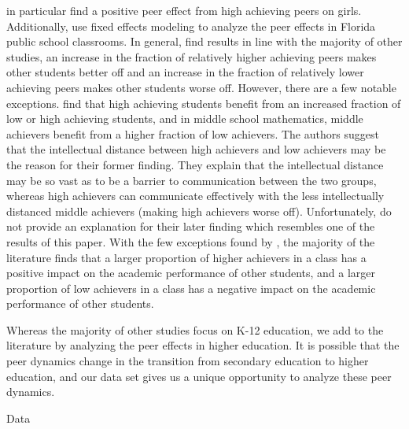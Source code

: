 \documentclass[12pt,a4paper,english,fleqn]{article}
\makeatletter
\newcommand{\sectlabel}[1]{section~\ref{#1} (\nameref{#1})}
\renewcommand\section{\@startsection{section}{1}{\z@}
{-5ex \@plus -1ex \@minus -.2ex}{2.3ex \@plus.2ex}{\normalfont\large\bf}}
\makeatother
\begin{document}
\citeauthor{lavy2012good} in particular find a positive peer effect from high achieving peers on girls.
Additionally, \citet{burke2013classroom} use fixed effects modeling to analyze the peer effects in Florida public school classrooms.
In general, \citeauthor{burke2013classroom} find results in line with the majority of other studies, an increase in the fraction of relatively higher achieving peers makes other students better off and an increase in the fraction of relatively lower achieving peers makes other students worse off.
However, there are a few notable exceptions.
\citeauthor{burke2013classroom} find that high achieving students benefit from an increased fraction of low or high achieving students, and in middle school mathematics, middle achievers benefit from a higher fraction of low achievers.
The authors suggest that the intellectual distance between high achievers and low achievers may be the reason for their former finding.
They explain that the intellectual distance may be so vast as to be a barrier to communication between the two groups, whereas high achievers can communicate effectively with the less intellectually distanced middle achievers (making high achievers worse off). 
Unfortunately, \citeauthor{burke2013classroom} do not provide an explanation for their later finding which resembles one of the results of this paper.
With the few exceptions found by \citet{burke2013classroom}, the majority of the literature finds that a larger proportion of higher achievers in a class has a positive impact on the academic performance of other students, and a larger proportion of low achievers in a class has a negative impact on the academic performance of other students.%

Whereas the majority of other studies focus on K-12 education, we add to the literature by analyzing the peer effects in higher education. 
It is possible that the peer dynamics change in the transition from secondary education to higher education, and our data set gives us a unique opportunity to analyze these peer dynamics.

\section{Data}\label{data}
\end{document}

